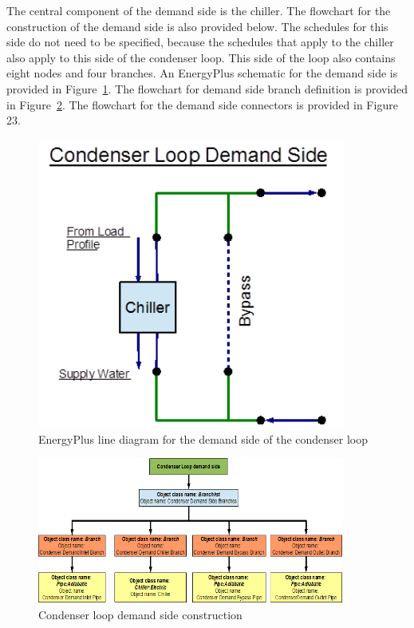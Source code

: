 The central component of the demand side is the chiller. The flowchart for the construction of the demand side is also provided below. The schedules for this side do not need to be specified, because the schedules that apply to the chiller also apply to this side of the condenser loop. This side of the loop also contains eight nodes and four branches. An EnergyPlus schematic for the demand side is provided in Figure~\ref{fig:energyplus-line-diagram-for-the-demand-side}. The flowchart for demand side branch definition is provided in Figure~\ref{fig:condenser-loop-demand-side-construction}. The flowchart for the demand side connectors is provided in Figure 23.

\begin{figure}[hbtp] %
\centering
\includegraphics[width=0.9\textwidth, height=0.9\textheight, keepaspectratio=true]{media/image034.png}
\caption{EnergyPlus line diagram for the demand side of the condenser loop \protect \label{fig:energyplus-line-diagram-for-the-demand-side}}
\end{figure}

\begin{figure}[hbtp] %
\centering
\includegraphics[width=0.9\textwidth, height=0.9\textheight, keepaspectratio=true]{media/image035.png}
\caption{Condenser loop demand side construction \protect \label{fig:condenser-loop-demand-side-construction}}
\end{figure}


